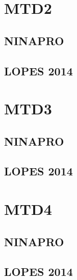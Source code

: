 \section{MTD2}
\subsection{NINAPRO}
\subsection{LOPES 2014}
\section{MTD3}
\subsection{NINAPRO}
\subsection{LOPES 2014}
\section{MTD4}
\subsection{NINAPRO}
\subsection{LOPES 2014}
